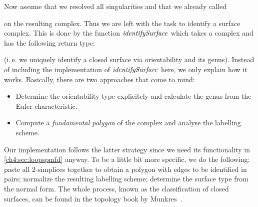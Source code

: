 Now assume that we resolved all singularities and that we already called\begin{hscode}\SaveRestoreHook
{}%
%
%
\>[3]{}\mathbin{::}\;\<[E]%
\ColumnHook
\end{hscode}\resethooks
on the resulting complex. Thus we are left with the task to identify a surface
complex. This is done by the function \ensuremath{\Varid{identifySurface}} which takes a complex
and has the following return type:
\resethooks
(i.\,e. we uniquely identify a closed surface via orientability
and its genus). Instead of including the implementation of
\ensuremath{\Varid{identifySurface}} here, we only explain how it works. Basically,
there are two approaches that come to mind:
\begin{itemize}[topsep=5pt,labelindent=0pt]
\item
    Determine the orientability type explicitely and calculate the genus from
    the Euler characteristic.
\item
    Compute a \emph{fundamental polygon} of the complex and analyse
    the labelling scheme.
\end{itemize}
Our implementation follows the latter strategy since we need its functionality
in \cref{ch4:sec:loopspmfd} anyway. To be a little bit more specific, we do the
following: paste all $2$-simplices together to obtain a polygon with edges to be
identified in pairs; normalize the resulting labelling scheme; determine the
surface type from the normal form. The whole process, known as the
classification of closed surfaces, can be found in the topology book by
Munkres~\cite[Ch.~12]{bookc:munkres00}.


